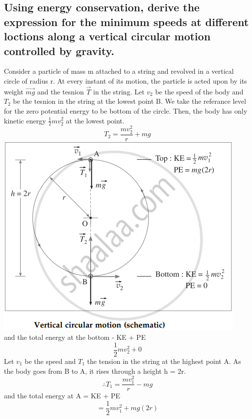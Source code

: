\documentclass{article}
\begin{document}
   \subsection{Using energy conservation, derive the expression
   for the minimum speeds at different loctions along a vertical
   circular motion controlled by gravity.}
   Consider a particle of mass m attached to a string and
   revolved in a vertical circle of radius r. At every instant of
   its motion, the particle is acted upon by its weight 
   $\vec{mg}$ and the tesnion $\vec{T}$ in the string. Let $v_2$
   be the speed of the body and $T_2$ be the tesnion in the 
   string at the lowest point B. We take the referance level 
   for the zero potential energy to be bottom of the circle.
   Then, the body has only kinetic energy $\frac{1}{2}mv_2^2$
   at the lowest point.
   \begin{equation}
   	T_2 = \frac{mv_2^2}{r} + mg
   \end{equation}
   \includegraphics[scale=0.5]{vcm} \\
   and the total energy at the bottom - KE + PE
   \begin{equation}
	   \frac{1}{2}mv_2^2 + 0
   \end{equation}
   Let $v_1$ be the speed and $T_1$ the tension in the string
   at the highest point A. As the body goes from B to A, it 
   rises through a height h = 2r.
   \begin{equation}
	   \therefore T_1 = \frac{mv_1^2}{r} - mg
   \end{equation}
   and the total energy at A = KE + PE
   \begin{equation}
	   = \frac{1}{2} mv_1^2 + mg(2r)
   \end{equation}
\end{document}
